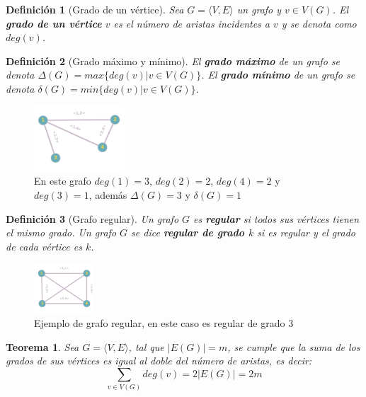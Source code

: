 \documentclass[a4paper,1pt]{report}
\newtheorem*{teo}{Teorema}
\newtheorem*{dfn}{Definición}
\begin{document}
\begin{dfn}[Grado de un vértice]
    Sea $G = \langle V, E \rangle $ un grafo y $v \in V(G)$. El \textbf{grado de un vértice} $v$ es el número de aristas incidentes a $v$ y se denota como $deg(v)$.
\end{dfn}

\begin{dfn}[Grado máximo y mínimo]
    El \textbf{grado m\'aximo}  de un grafo se denota $\Delta(G) = max\{ deg(v) | v \in V(G)\}$. El \textbf{grado mínimo} de un grafo se denota $\delta(G) = min \{deg(v) | v \in V(G)\}$.
\end{dfn}


\begin{figure}[htb]
    \centering
    \includegraphics[width=0.3\textwidth]{figures/grafo.png}
    \caption{En este grafo $deg(1) = 3$, $deg(2) = 2$, $deg(4) = 2$ y $deg(3) =1$, adem\'as $\Delta(G) = 3$ y $\delta(G) = 1$}
\end{figure} 
    

\begin{dfn}[Grafo regular]
    Un grafo $G$ es \textbf{regular} si todos sus vértices tienen el mismo grado.
Un grafo $G$  se dice \textbf{regular de grado $k$} si es regular y el grado de cada vértice es $k$.
\end{dfn}

\begin{figure}[htb]
    \centering
    \includegraphics[width=0.2\textwidth]{figures/regular.png}
    \caption{Ejemplo de grafo regular, en este caso es regular de grado 3}
\end{figure} 

\begin{teo}
Sea $G = \langle V, E \rangle$, tal que $|E(G)| = m$, se cumple que la suma de los grados de sus v\'ertices es igual al doble del n\'umero de aristas, es decir: $$\sum_{v \in V(G)} deg(v) = 2 |E(G)| = 2m$$
\end{teo}
\end{document}
